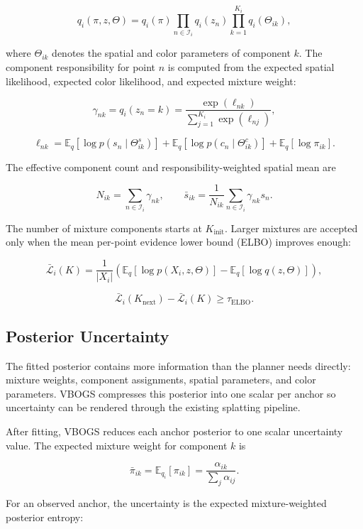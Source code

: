 \documentclass{article}
\begin{document}
\[
  q_i(\pi,z,\Theta)
  =
  q_i(\pi)
  \prod_{n \in \mathcal{I}_i} q_i(z_n)
  \prod_{k=1}^{K_i} q_i(\Theta_{ik}),
\]

where \(\Theta_{ik}\) denotes the spatial and color parameters of component \(k\). The component responsibility for point \(n\) is computed from the expected spatial likelihood, expected color likelihood, and expected mixture weight:

\[
  \gamma_{nk}
  =
  q_i(z_n=k)
  =
  \frac{\exp(\ell_{nk})}
       {\sum_{j=1}^{K_i}\exp(\ell_{nj})},
\]

\[
  \ell_{nk}
  =
  \mathbb{E}_{q}[\log p(s_n \mid \Theta^s_{ik})]
  +
  \mathbb{E}_{q}[\log p(c_n \mid \Theta^c_{ik})]
  +
  \mathbb{E}_{q}[\log \pi_{ik}].
\]

The effective component count and responsibility-weighted spatial mean are

\[
  N_{ik} = \sum_{n \in \mathcal{I}_i} \gamma_{nk},
  \qquad
  \bar{s}_{ik}
  =
  \frac{1}{N_{ik}}
  \sum_{n \in \mathcal{I}_i}
  \gamma_{nk}s_n.
\]

The number of mixture components starts at \(K_{\mathrm{init}}\). Larger mixtures are accepted only when the mean per-point evidence lower bound (ELBO) improves enough:

\[
  \bar{\mathcal{L}}_i(K)
  =
  \frac{1}{|X_i|}
  \left(
    \mathbb{E}_q[\log p(X_i,z,\Theta)]
    -
    \mathbb{E}_q[\log q(z,\Theta)]
  \right),
\]

\[
  \bar{\mathcal{L}}_i(K_{\mathrm{next}})
  -
  \bar{\mathcal{L}}_i(K)
  \geq
  \tau_{\mathrm{ELBO}}.
\]

\subsection{Posterior Uncertainty}
The fitted posterior contains more information than the planner needs directly: mixture weights, component assignments, spatial parameters, and color parameters. VBOGS compresses this posterior into one scalar per anchor so uncertainty can be rendered through the existing splatting pipeline.

After fitting, VBOGS reduces each anchor posterior to one scalar uncertainty value. The expected mixture weight for component \(k\) is

\[
  \bar{\pi}_{ik}
  =
  \mathbb{E}_{q_i}[\pi_{ik}]
  =
  \frac{\alpha_{ik}}{\sum_j \alpha_{ij}}.
\]

For an observed anchor, the uncertainty is the expected mixture-weighted posterior entropy:
\end{document}
